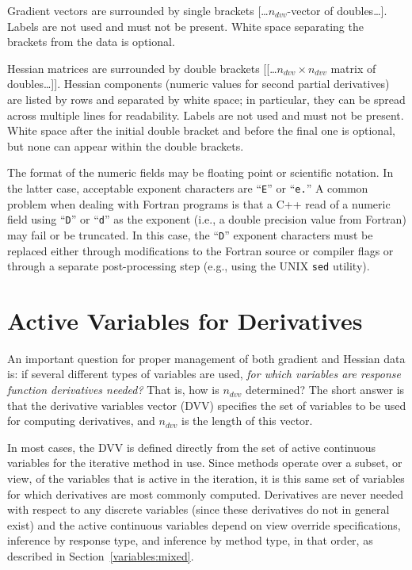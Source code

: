 Gradient vectors are surrounded by single brackets
[\ldots$n_{dvv}$-vector of doubles\ldots]. Labels are not used and must
not be present. White space separating the brackets from the data is
optional.

Hessian matrices are surrounded by double brackets
[[\ldots$n_{dvv} \times n_{dvv}$ matrix of doubles\ldots]].  Hessian
components (numeric values for second partial derivatives) are
listed by rows and separated by white space; in particular, they
can be spread across multiple
lines for readability.  Labels are not used and must not be present.
White space after the initial double bracket and before the final one
is optional, but none can appear within the double brackets.

The format of the numeric fields may be floating point or scientific
notation. In the latter case, acceptable exponent characters are
``\texttt{E}'' or ``\texttt{e.}'' A common problem when dealing with
Fortran programs is that a C++ read of a numeric field using
``\texttt{D}'' or ``\texttt{d}'' as the exponent (i.e., a double
precision value from Fortran) may fail or be truncated. In this case,
the ``\texttt{D}'' exponent characters must be replaced either through
modifications to the Fortran source or compiler flags or through a
separate post-processing step (e.g., using the UNIX \texttt{sed}
utility).

\section{Active Variables for Derivatives}\label{responses:active}

An important question for proper management of both gradient and
Hessian data is: if several different types of variables are used,
\emph{for which variables are response function derivatives needed?}
That is, how is $n_{dvv}$ determined?  The short answer is that the
derivative variables vector (DVV) specifies the set of variables to be
used for computing derivatives, and $n_{dvv}$ is the length of this
vector.  

In most cases, the DVV is defined directly from the set of active
continuous variables for the iterative method in use.  Since methods
operate over a subset, or view, of the variables that is active in the
iteration, it is this same set of variables for which derivatives are
most commonly computed.  Derivatives are never needed with respect to
any discrete variables (since these derivatives do not in general
exist) and the active continuous variables depend on view override
specifications, inference by response type, and inference by method
type, in that order, as described in Section~\ref{variables:mixed}.

